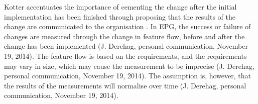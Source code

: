 \documentclass[final_report_innit.tex]{subfiles}
\begin{document}
Kotter accentuates the importance of cementing the change after the initial implementation has been finished through proposing that the results of the change are communicated to the organisation \cite{kotter1995leading}. In EPG, the success or failure of changes are measured through the change in feature flow, before and after the change has been implemented (J. Derehag, personal communication, November 19, 2014). The feature flow is based on the requirements, and the requirements may vary in size, which may cause the measurement to be imprecise (J. Derehag, personal communication, November 19, 2014). The assumption is, however, that the results of the measurements will normalise over time (J. Derehag, personal communication, November 19, 2014).   
\end{document}
